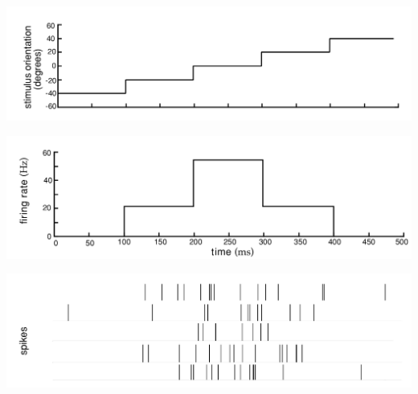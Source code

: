 \begin{center}
    \label{fig:1.13A}    
    \includegraphics[scale = 0.2]{png/Figure1-13-A.png}\\
\end{center}

\begin{center}
    \label{fig:1.13B}    
    \includegraphics[scale = 0.2]{png/Figure1-13-B.png}\\
\end{center}

\begin{center}
    \label{fig:1.13C}    
    \includegraphics[scale = 0.2]{png/Figure1-13-C.png}\\
\end{center}


